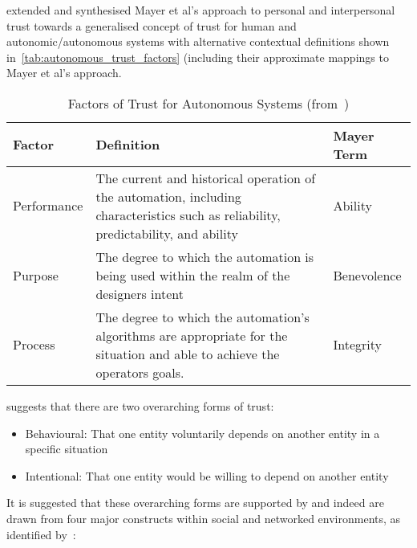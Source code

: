 
\citet{Lee2004} extended and synthesised Mayer et al's approach to personal and interpersonal trust towards a generalised concept of trust for human and autonomic/autonomous systems with alternative contextual definitions shown in~\autoref{tab:autonomous_trust_factors} (including their approximate mappings to Mayer et al's approach.

\begin{table}
  \caption[Factors of Trust for Autonomous Systems]{Factors of Trust for Autonomous Systems (from~\citet{Lee2004})}
  \label{tab:autonomous_trust_factors}
  \begin{tabularx}{\textwidth}{p{2cm}X p{2cm}}\toprule
    Factor & Definition & Mayer Term\\ \midrule
    Performance & The current and historical operation of the automation, including characteristics such as reliability, predictability, and ability & Ability\\
    Purpose & The degree to which the automation is being used within the realm of the designers intent & Benevolence \\
    Process & The degree to which the automation's algorithms are appropriate for the situation and able to achieve the operators goals.
    & Integrity\\

    \bottomrule
  \end{tabularx}
\end{table}

\pagebreak
\citet{Sun2008} suggests that there are two overarching forms of trust:
\begin{itemize}
  \item Behavioural: That one entity voluntarily depends on another entity in a specific situation
  \item Intentional: That one entity would be willing to depend on another entity
\end{itemize}

It is suggested that these overarching forms are supported by and indeed are drawn from four major constructs within social and networked environments, as identified by~\citet{Mcknight1996}:

